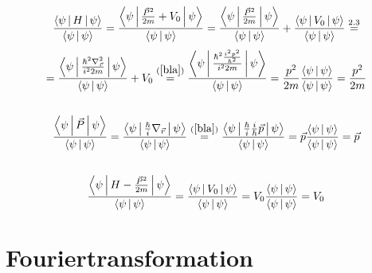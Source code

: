 \documentclass[a4paper,11pt]{article}
\begin{document}
\subsection{}
\begin{equation}
        \frac{\Braket{\psi|H|\psi}}{\Braket{\psi|\psi}} = \frac{\Braket{\psi|\frac{\vec{P}^2}{2m} + V_0|\psi}}{\Braket{\psi|\psi}} = \frac{\Braket{\psi|\frac{\vec{P}^2}{2m}|\psi}}{\Braket{\psi|\psi}} + \frac{\Braket{\psi|V_0|\psi}}{\Braket{\psi|\psi}} \overset{2.3}{=}
\end{equation}
\begin{equation}
        = \frac{\Braket{\psi|\frac{\hbar^2\nabla^2_{\vec{r}}}{i^22m}|\psi}}{\Braket{\psi|\psi}} + V_0 \overset{(\ref{bla})}{=} \frac{\Braket{\psi|\frac{\hbar^2\frac{i^2p^2}{\hbar^2}}{i^22m}|\psi}}{\Braket{\psi|\psi}} = \frac{p^2}{2m}\frac{\Braket{\psi|\psi}}{\Braket{\psi|\psi}} = \frac{p^2}{2m}
\end{equation}

\subsection{}
\begin{equation}
        \frac{\Braket{\psi|\vec{P}|\psi}}{\Braket{\psi|\psi}} = \frac{\Braket{\psi|\frac{\hbar}{i}\nabla_{\vec{r}}|\psi}}{\Braket{\psi|\psi}} \overset{(\ref{bla})}{=} \frac{\Braket{\psi|\frac{\hbar}{i}\frac{i}{\hbar}\vec{p}|\psi}}{\Braket{\psi|\psi}} = \vec{p}\frac{\Braket{\psi|\psi}}{\Braket{\psi|\psi}} = \vec{p}
\end{equation}

\subsection{}
\begin{equation}
        \frac{\Braket{\psi|H - \frac{\vec{P}^2}{2m}|\psi}}{\Braket{\psi|\psi}} = \frac{\Braket{\psi|V_0|\psi}}{\Braket{\psi|\psi}} = V_0\frac{\Braket{\psi|\psi}}{\Braket{\psi|\psi}} = V_0
\end{equation}

\section{Fouriertransformation}
\end{document}
